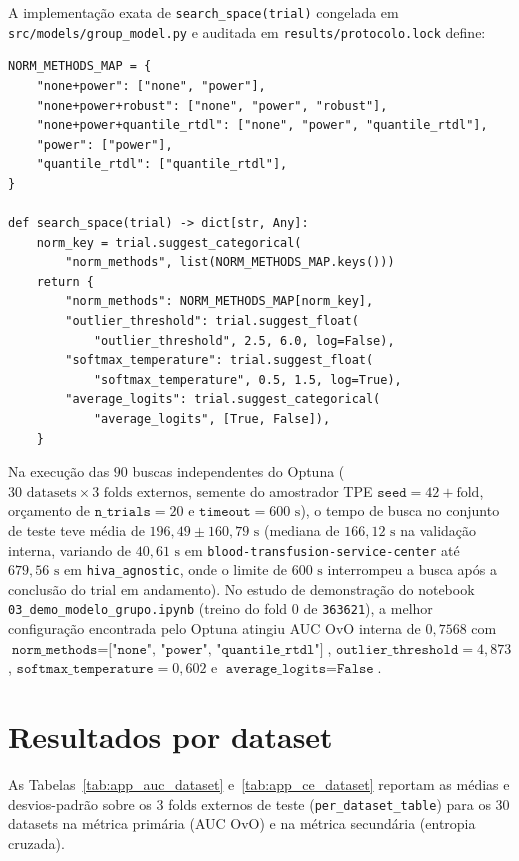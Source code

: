 \documentclass[11pt,a4paper]{article}
\begin{document}
A implementação exata de \texttt{search\_space(trial)} congelada em \texttt{src/models/group\_model.py} e auditada em \texttt{results/protocolo.lock} define:
\begin{verbatim}
NORM_METHODS_MAP = {
    "none+power": ["none", "power"],
    "none+power+robust": ["none", "power", "robust"],
    "none+power+quantile_rtdl": ["none", "power", "quantile_rtdl"],
    "power": ["power"],
    "quantile_rtdl": ["quantile_rtdl"],
}

def search_space(trial) -> dict[str, Any]:
    norm_key = trial.suggest_categorical(
        "norm_methods", list(NORM_METHODS_MAP.keys()))
    return {
        "norm_methods": NORM_METHODS_MAP[norm_key],
        "outlier_threshold": trial.suggest_float(
            "outlier_threshold", 2.5, 6.0, log=False),
        "softmax_temperature": trial.suggest_float(
            "softmax_temperature", 0.5, 1.5, log=True),
        "average_logits": trial.suggest_categorical(
            "average_logits", [True, False]),
    }
\end{verbatim}

Na execução das $90$ buscas independentes do Optuna ($30\text{ datasets} \times 3\text{ folds externos}$, semente do amostrador TPE $\texttt{seed} = 42 + \text{fold}$, orçamento de $\texttt{n\_trials} = 20$ e $\texttt{timeout} = 600\text{ s}$), o tempo de busca no conjunto de teste teve média de $196{,}49 \pm 160{,}79\text{ s}$ (mediana de $166{,}12\text{ s}$ na validação interna, variando de $40{,}61\text{ s}$ em \texttt{blood-transfusion-service-center} até $679{,}56\text{ s}$ em \texttt{hiva\_agnostic}, onde o limite de $600\text{ s}$ interrompeu a busca após a conclusão do trial em andamento). No estudo de demonstração do notebook \texttt{03\_demo\_modelo\_grupo.ipynb} (treino do fold 0 de \texttt{363621}), a melhor configuração encontrada pelo Optuna atingiu AUC OvO interna de $0{,}7568$ com $\texttt{norm\_methods} = \texttt{["none", "power", "quantile\_rtdl"]}$, $\texttt{outlier\_threshold} = 4{,}873$, $\texttt{softmax\_temperature} = 0{,}602$ e $\texttt{average\_logits} = \texttt{False}$.

\section{Resultados por dataset}
\label{app:por_dataset}

As Tabelas~\ref{tab:app_auc_dataset} e~\ref{tab:app_ce_dataset} reportam as médias e desvios-padrão sobre os 3 folds externos de teste (\texttt{per\_dataset\_table}) para os 30 datasets na métrica primária (AUC OvO) e na métrica secundária (entropia cruzada).
\end{document}
